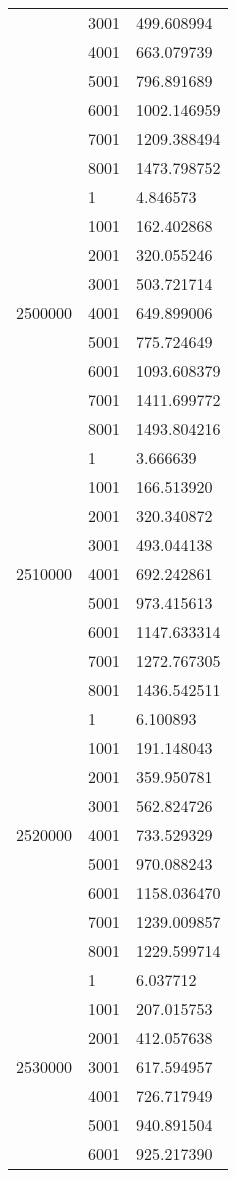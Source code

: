 \begin{table}[htb!]
\begin{tabular}{lll}
 & 3001 & 499.608994 \\
 & 4001 & 663.079739 \\
 & 5001 & 796.891689 \\
 & 6001 & 1002.146959 \\
 & 7001 & 1209.388494 \\
 & 8001 & 1473.798752 \\
\multirow[c]{9}{*}{2500000} & 1 & 4.846573 \\
 & 1001 & 162.402868 \\
 & 2001 & 320.055246 \\
 & 3001 & 503.721714 \\
 & 4001 & 649.899006 \\
 & 5001 & 775.724649 \\
 & 6001 & 1093.608379 \\
 & 7001 & 1411.699772 \\
 & 8001 & 1493.804216 \\
\multirow[c]{9}{*}{2510000} & 1 & 3.666639 \\
 & 1001 & 166.513920 \\
 & 2001 & 320.340872 \\
 & 3001 & 493.044138 \\
 & 4001 & 692.242861 \\
 & 5001 & 973.415613 \\
 & 6001 & 1147.633314 \\
 & 7001 & 1272.767305 \\
 & 8001 & 1436.542511 \\
\multirow[c]{9}{*}{2520000} & 1 & 6.100893 \\
 & 1001 & 191.148043 \\
 & 2001 & 359.950781 \\
 & 3001 & 562.824726 \\
 & 4001 & 733.529329 \\
 & 5001 & 970.088243 \\
 & 6001 & 1158.036470 \\
 & 7001 & 1239.009857 \\
 & 8001 & 1229.599714 \\
\multirow[c]{9}{*}{2530000} & 1 & 6.037712 \\
 & 1001 & 207.015753 \\
 & 2001 & 412.057638 \\
 & 3001 & 617.594957 \\
 & 4001 & 726.717949 \\
 & 5001 & 940.891504 \\
 & 6001 & 925.217390 \\

\end{tabular}
\end{table}
